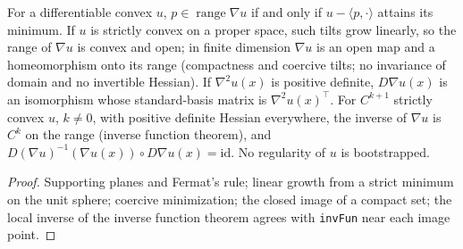 \begin{lemma}
  \label{lem:strict-convex-gradient-inverse}
  \leanok
  For a differentiable convex $u$, $p\in\operatorname{range}\nabla u$ if and only if $u-\langle p,\cdot\rangle$ attains its
  minimum. If $u$ is strictly convex on a proper space, such tilts grow linearly, so the range of $\nabla u$ is convex and open;
  in finite dimension $\nabla u$ is an open map and a homeomorphism onto its range (compactness and coercive tilts; no invariance
  of domain and no invertible Hessian). If $\nabla^2u(x)$ is positive definite, $D\nabla u(x)$ is an isomorphism whose
  standard-basis matrix is $\nabla^2u(x)^{\top}$. For $C^{k+1}$ strictly convex $u$, $k\ne0$, with positive definite Hessian
  everywhere, the inverse of $\nabla u$ is $C^k$ on the range (inverse function theorem), and
  $D(\nabla u)^{-1}(\nabla u(x))\circ D\nabla u(x)=\mathrm{id}$. No regularity of $u$ is bootstrapped.
\end{lemma}
\begin{proof}
  \leanok
  Supporting planes and Fermat's rule; linear growth from a strict minimum on the unit sphere; coercive minimization; the
  closed image of a compact set; the local inverse of the inverse function theorem agrees with \texttt{invFun} near each image
  point.
\end{proof}

